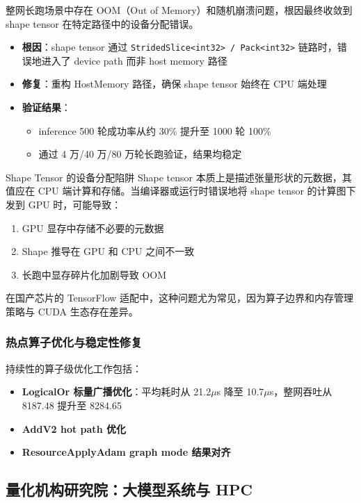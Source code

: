 \documentclass[a4paper]{article}
\begin{document}
整网长跑场景中存在 OOM（Out of Memory）和随机崩溃问题，根因最终收敛到 shape tensor 在特定路径中的设备分配错误。

\begin{itemize}
    \item \textbf{根因}：shape tensor 通过 \texttt{StridedSlice<int32> / Pack<int32>} 链路时，错误地进入了 device path 而非 host memory 路径
    \item \textbf{修复}：重构 HostMemory 路径，确保 shape tensor 始终在 CPU 端处理
    \item \textbf{验证结果}：
    \begin{itemize}
        \item inference 500 轮成功率从约 30\% 提升至 1000 轮 100\%
        \item 通过 4 万/40 万/80 万轮长跑验证，结果均稳定
    \end{itemize}
\end{itemize}

\begin{warningbox}{Shape Tensor 的设备分配陷阱}
Shape tensor 本质上是描述张量形状的元数据，其值应在 CPU 端计算和存储。当编译器或运行时错误地将 shape tensor 的计算图下发到 GPU 时，可能导致：
\begin{enumerate}
    \item GPU 显存中存储不必要的元数据
    \item Shape 推导在 GPU 和 CPU 之间不一致
    \item 长跑中显存碎片化加剧导致 OOM
\end{enumerate}
在国产芯片的 TensorFlow 适配中，这种问题尤为常见，因为算子边界和内存管理策略与 CUDA 生态存在差异。
\end{warningbox}

\subsubsection{热点算子优化与稳定性修复}

持续性的算子级优化工作包括：

\begin{itemize}
    \item \textbf{LogicalOr 标量广播优化}：平均耗时从 21.2$\mu$s 降至 10.7$\mu$s，整网吞吐从 8187.48 提升至 8284.65
    \item \textbf{AddV2 hot path 优化}
    \item \textbf{ResourceApplyAdam graph mode 结果对齐}
\end{itemize}

\subsection{量化机构研究院：大模型系统与 HPC}
\end{document}
